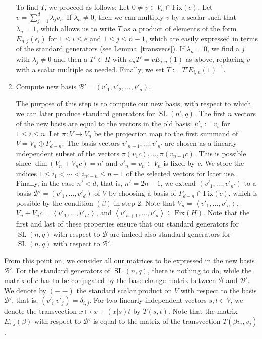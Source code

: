 \documentclass[a4paper,11pt]{article}
\def\SL{\operatorname{SL}}
\newcommand{\Fix}[1]{\mathrm{Fix}(#1)}
\newcommand{\B}{\mathcal{B}}
\begin{document}
\begin{enumerate}
To find $T$, we proceed as follows: Let $0 \neq v \in V_n \cap \Fix c$.
Let $v = \sum_{j=1}^d \lambda_j v_i$. If $\lambda_n \neq 0$, 
then we can multiply $v$ by a scalar such that
$\lambda_n = 1$, which allows us to write $T$ as a product of
elements of the form $E_{n,j}(\epsilon_i)$ for $1 \le i \le e$
and $1 \le j \le n-1$, which are easily expressed in terms of the
standard generators (see Lemma~\ref{transvecs}).
If $\lambda_n = 0$, we find a $j$ with $\lambda_j \neq 0$ and
then a $T' \in H$ with $v_n T' = vE_{j,n}(1)$ as above,
replacing $v$ with a scalar multiple as needed. Finally, we set
$T := T' E_{i,n}(1)^{-1}$.
\item Compute new basis $\B' = (v'_1,v'_2,\ldots,v'_d)$.

The purpose of this step is to compute our new basis, with respect to
which we can later produce standard generators for $\SL(n',q)$.
The first $n$ vectors of the new basis are equal to the vectors in
the old basis: $v'_i := v_i$ for $1 \le i \le n$.
Let $\pi: V \to V_n$ be the projection map to the first summand of
$V = V_n \oplus F_{d-n}$. The basis vectors
$v'_{n+1}, \ldots, v'_{n'}$ are chosen as a linearly independent subset
of the vectors $\pi(v_1c), \ldots, \pi(v_{n-1}c)$. This is possible
since $\dim(V_n + V_n c) = n'$ and $v'_n=v_n \in V_n$ is fixed by $c$.
We store the indices $1 \le i_1 < \cdots < i_{n'-n} \le n-1$ of the
selected vectors for later use. Finally, in the case $n' < d$, that is,
$n'=2n-1$, we extend $(v'_1, \ldots, v'_{n'})$ to a basis $\B' = (v'_1,
\ldots, v'_d)$ of $V$ by choosing a basis of $F_{d-n} \cap \Fix c$, which
is possible by the condition $(\beta)$ in step 2. Note that $V_n =
\left< v'_1, \ldots, v'_n\right>$, $V_n + V_nc = \left< v'_1, \ldots,
v'_{n'}\right>$, and $\left< v'_{n+1}, \ldots, v'_d\right> \subseteq \Fix
H$. Note that the first and last of these properties ensure that our standard generators
for $\SL(n,q)$ with respect to $\B$ are indeed also standard generators
for $\SL(n,q)$ with respect to $\B'$.
\end{enumerate}

\noindent
From this point on, we consider all our matrices to be expressed in the
new basis $\B'$. For the standard generators of $\SL(n,q)$, there is nothing to do, while 
the matrix of $c$ has to be conjugated by the base change matrix between
$\B$ and $\B'$. We denote by $(-|-)$ the standard scalar product on $V$
with respect to the basis $\B'$, that is, $(v'_i|v'_j) = \delta_{i,j}$.
For two linearly independent vectors $s,t \in V$, we denote the transvection $x \mapsto x +
(x|s)t$ by $T(s,t)$. Note that the matrix $E_{i,j}(\beta)$ with respect
to $\B'$ is equal to the matrix of the transvection $T(\beta v_i,v_j)$.
\end{document}
